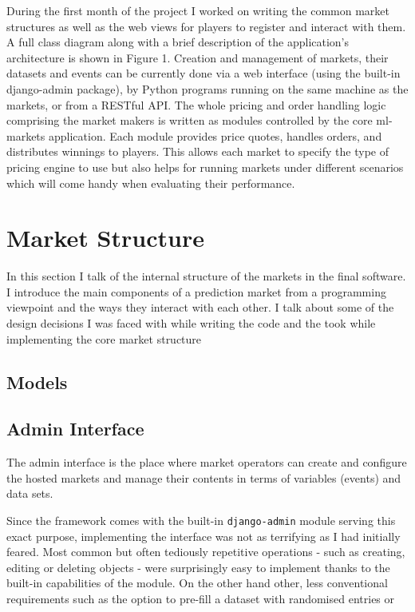\documentclass[bsc,frontabs,twoside,singlespacing,parskip,deptreport]{infthesis}     %
\begin{document}
	
	During the first month of the project I worked on writing the common market structures as well as the web views for players to register and interact with them. A full class diagram along with a brief description of the application’s architecture is shown in Figure 1. Creation and management of markets, their datasets and events can be currently done via a web interface (using the built-in django-admin package), by Python programs running on the same machine as the markets, or from a RESTful API.
The whole pricing and order handling logic comprising the market makers is written as modules controlled by the core ml-markets application. Each module provides price quotes, handles orders, and distributes winnings to players. This allows each market to specify the type of pricing engine to use but also helps for running markets under different scenarios which will come handy when evaluating their performance.  

\section{Market Structure}
	In this section I talk of the internal structure of the markets in the final software. I introduce the main components of a prediction market from a programming viewpoint and the ways they interact with each other. I talk about some of the design decisions I was faced with while writing the code and the took while implementing the core market structure

\subsection{Models}
	

\subsection{Admin Interface}
	The admin interface is the place where market operators can create and configure the hosted markets and manage their contents in terms of variables (events) and data sets. 

	Since the framework comes with the built-in {\tt django-admin} module serving this exact purpose, implementing the interface was not as terrifying as I had initially feared. Most common but often tediously repetitive operations - such as creating, editing or deleting objects - were surprisingly easy to implement thanks to the built-in capabilities of the module. On the other hand other, less conventional requirements such as the option to pre-fill a dataset with randomised entries or 
\end{document}
